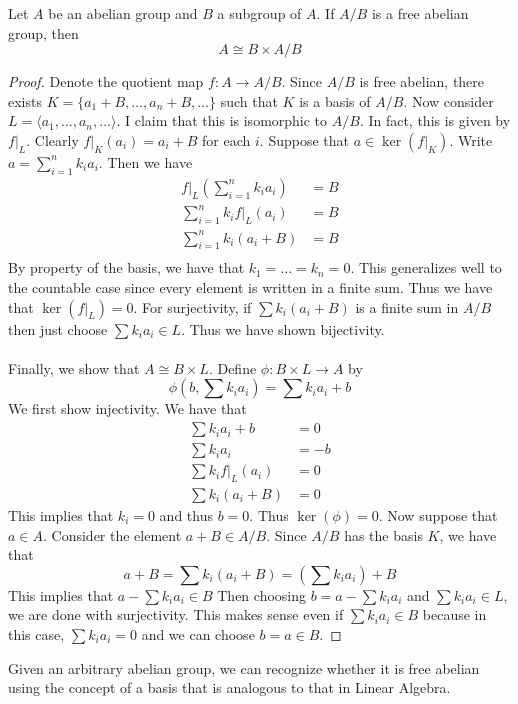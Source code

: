 \documentclass[a4paper]{article}
\begin{document}
\begin{prp}{}{} Let $A$ be an abelian group and $B$ a subgroup of $A$. If $A/B$ is a free abelian group, then $$A\cong B\times A/B$$ \tcbline
\begin{proof}
Denote the quotient map $f:A\to A/B$. Since $A/B$ is free abelian, there exists $K=\{a_1+B,\dots,a_n+B,\dots\}$ such that $K$ is a basis of $A/B$. Now consider $L=\langle a_1,\dots,a_n,\dots\rangle$. I claim that this is isomorphic to $A/B$. In fact, this is given by $f|_L$. Clearly $f|_K(a_i)=a_i+B$ for each $i$. Suppose that $a\in\ker(f|_K)$. Write $a=\sum_{i=1}^nk_ia_i$. Then we have 
\begin{align*}
f|_L\left(\sum_{i=1}^nk_ia_i\right)&=B\\
\sum_{i=1}^nk_if|_L(a_i)&=B\\
\sum_{i=1}^nk_i(a_i+B)&=B\\
\end{align*}
By property of the basis, we have that $k_1=\dots=k_n=0$. This generalizes well to the countable case since every element is written in a finite sum. Thus we have that $\ker(f|_L)=0$. For surjectivity, if $\sum k_i(a_i+B)$ is a finite sum in $A/B$ then just choose $\sum k_ia_i\in L$. Thus we have shown bijectivity. \\~\\
Finally, we show that $A\cong B\times L$. Define $\phi:B\times L\to A$ by $$\phi\left(b,\sum k_ia_i\right)=\sum k_ia_i+b$$ We first show injectivity. We have that 
\begin{align*}
\sum k_ia_i+b&=0\\
\sum k_ia_i&=-b\\
\sum k_if|_L(a_i)&=0\\
\sum k_i(a_i+B)&=0
\end{align*}
This implies that $k_i=0$ and thus $b=0$. Thus $\ker(\phi)=0$. Now suppose that $a\in A$. Consider the element $a+B\in A/B$. Since $A/B$ has the basis $K$, we have that $$a+B=\sum k_i(a_i+B)=\left(\sum k_ia_i\right)+B$$ This implies that $a-\sum k_ia_i\in B$ Then choosing $b=a-\sum k_ia_i$ and $\sum k_ia_i\in L$, we are done with surjectivity. This makes sense even if $\sum k_ia_i\in B$ because in this case, $\sum k_ia_i=0$ and we can choose $b=a\in B$. 
\end{proof}
\end{prp}

Given an arbitrary abelian group, we can recognize whether it is free abelian using the concept of a basis that is analogous to that in Linear Algebra. 
\end{document}
